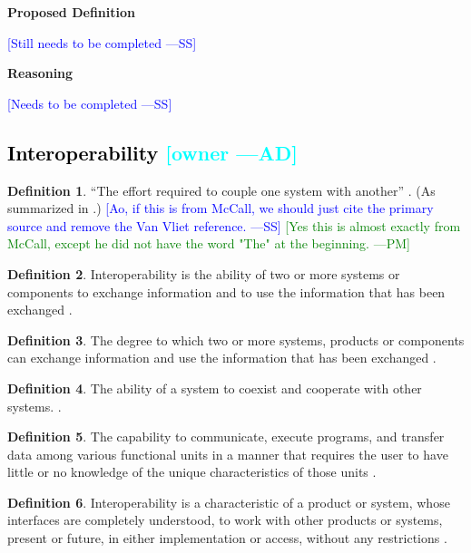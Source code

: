 \documentclass[letterpaper,cleveref]{lipics-v2019}
\newcommand{\authornote}[3]{\textcolor{#1}{[#3 ---#2]}}
\newcommand{\authornote}[3]{}
\newcommand{\wss}[1]{\authornote{blue}{SS}{#1}} %
\newcommand{\pmi}[1]{\authornote{green}{PM}{#1}} %
\newcommand{\ad}[1]{\authornote{cyan}{AD}{#1}} %
\newcommand{\done}[1]{\textcolor{black}{#1}}
\theoremstyle{definition}
\newtheorem{defn}{Definition}
\begin{document}
\noindent \textbf{Proposed Definition}

\wss{Still needs to be completed}

\noindent \textbf{Reasoning}

\wss{Needs to be completed}

\subsection{\done{Interoperability} \ad{owner}}

\begin{defn}
  ``The effort required to couple one system with another''
  \citep{McCallEtAl1977}. (As summarized in \citet{VanVliet2000}.)  \wss{Ao, if
    this is from McCall, we should just cite the primary source and remove the
    Van Vliet reference.} \pmi{Yes this is almost exactly from McCall, except he did not have the word "The" at the beginning.}
\end{defn}

\begin{defn}
  Interoperability is the ability of two or more systems or components to
  exchange information and to use the information that has been exchanged
  \citep{IEEEComputerDictionary1991}.
\end{defn}

\begin{defn}
  \label{InteroperabilitySelected}
  The degree to which two or more systems, products or components can exchange
  information and use the information that has been exchanged
  \citep{ISO/IEC25010}.
\end{defn}

\begin{defn}
  The ability of a system to coexist and cooperate with other systems.
  \citep{ghezzi1991fundamentals}.
\end{defn}

\begin{defn}
  The capability to communicate, execute programs, and transfer data among
  various functional units in a manner that requires the user to have little or
  no knowledge of the unique characteristics of those units
  \citep{ISO/IEC/IEEE24765}.
\end{defn}

\begin{defn}
  Interoperability is a characteristic of a product or system, whose interfaces
  are completely understood, to work with other products or systems, present or
  future, in either implementation or access, without any restrictions
  \citep{AFUL2019}.
\end{defn}
\end{document}
